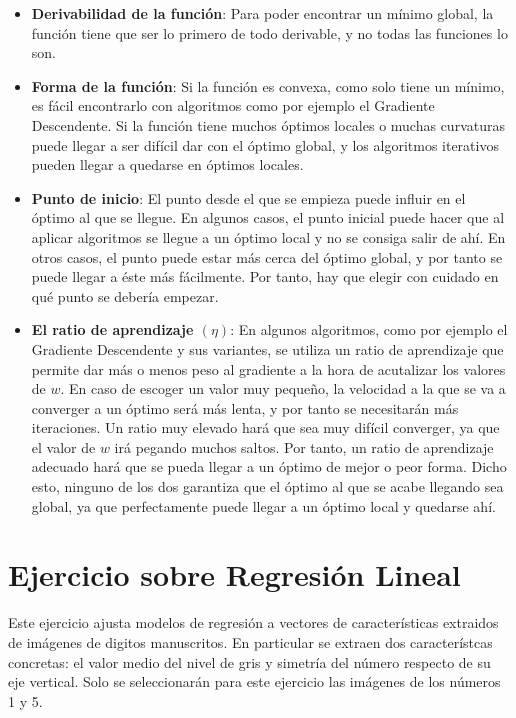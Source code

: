 \documentclass[11pt,a4paper]{article}
\begin{document}
\begin{itemize}[label=\textbullet]
	\item \textbf{Derivabilidad de la función}: Para poder encontrar un mínimo global, la función tiene que ser lo primero
	de todo derivable, y no todas las funciones lo son.
	\item \textbf{Forma de la función}: Si la función es convexa, como solo tiene un mínimo, es fácil encontrarlo con
	algoritmos como por ejemplo el Gradiente Descendente. Si la función tiene muchos óptimos locales o muchas curvaturas
	puede llegar a ser difícil dar con el óptimo global, y los algoritmos iterativos pueden llegar a quedarse en óptimos
	locales.
	\item \textbf{Punto de inicio}: El punto desde el que se empieza puede influir en el óptimo al que se llegue. En algunos
	casos, el punto inicial puede hacer que al aplicar algoritmos se llegue a un óptimo local y no se consiga salir de ahí.
	En otros casos, el punto puede estar más cerca del óptimo global, y por tanto se puede llegar a éste más fácilmente. Por
	tanto, hay que elegir con cuidado en qué punto se debería empezar.
	\item \textbf{El ratio de aprendizaje $(\eta)$}: En algunos algoritmos, como por ejemplo el Gradiente Descendente y sus
	variantes, se utiliza un ratio de aprendizaje que permite dar más o menos peso al gradiente a la hora de acutalizar los
	valores de $w$. En caso de escoger un valor muy pequeño, la velocidad a la que se va a converger a un óptimo será más
	lenta, y por tanto se necesitarán más iteraciones. Un ratio muy elevado hará que sea muy difícil converger, ya que el
	valor de $w$ irá pegando muchos saltos. Por tanto, un ratio de aprendizaje adecuado hará que se pueda llegar a un óptimo
	de mejor o peor forma. Dicho esto, ninguno de los dos garantiza que el óptimo al que se acabe llegando sea global, ya
	que perfectamente puede llegar a un óptimo local y quedarse ahí.
\end{itemize}

\section{Ejercicio sobre Regresión Lineal}

Este ejercicio ajusta modelos de regresión a vectores de características extraidos de imágenes de digitos manuscritos. En
particular se extraen dos característcas concretas: el valor medio del nivel de gris y simetría del número respecto de su eje
vertical. Solo se seleccionarán para este ejercicio las imágenes de los números 1 y 5.
\end{document}

